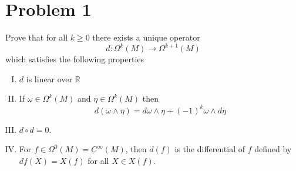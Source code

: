 \documentclass[a4paper]{article}
\begin{document}
\section*{Problem 1}%
Prove that for all $k \geq 0$ there exists a unique operator
\[
  d: \Omega^k(M) \rightarrow \Omega^{k+1}(M)
\]
which satisfies the following properties
\begin{enumerate}[I.]
  \item $d$ is linear over $\mathds{R}$
  \item If $\omega \in \Omega^k(M)$ and $\eta \in \Omega^k(M)$ then
    \[
      d(\omega \wedge \eta) = d\omega \wedge \eta + (-1)^k \omega \wedge d\eta
    \]
  \item $d \circ d = 0$.
  \item For $f \in \Omega^0(M) = C^\infty(M)$, then $d(f)$ is the differential of $f$ defined by $df(X) = X(f)$ for all $X \in X(f)$.
\end{enumerate}
\end{document}
